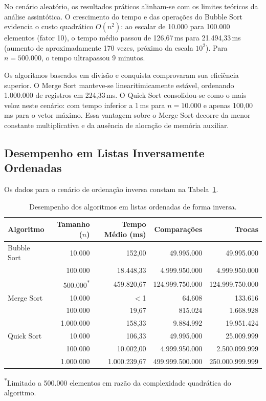 \documentclass[12pt]{article}
\begin{document}
No cenário aleatório, os resultados práticos alinham-se com os limites
teóricos da análise assintótica. O crescimento do tempo e das operações do
Bubble Sort evidencia o custo quadrático $O(n^2)$: ao escalar de 10.000 para
100.000 elementos (fator 10), o tempo médio passou de 126,67\,ms para
21.494,33\,ms (aumento de aproximadamente 170 vezes, próximo da escala
$10^2$). Para $n = 500.000$, o tempo ultrapassou 9 minutos.

Os algoritmos baseados em divisão e conquista comprovaram sua eficiência
superior. O Merge Sort manteve-se linearitimicamente estável, ordenando
1.000.000 de registros em 224,33\,ms. O Quick Sort consolidou-se como o mais
veloz neste cenário: com tempo inferior a 1\,ms para $n = 10.000$ e apenas
100,00\,ms para o vetor máximo. Essa vantagem sobre o Merge Sort decorre da
menor constante multiplicativa e da ausência de alocação de memória auxiliar.

\subsection{Desempenho em Listas Inversamente Ordenadas}

Os dados para o cenário de ordenação inversa constam na
Tabela~\ref{tab:inversas}.

\begin{table}[ht]
\centering
\caption{Desempenho dos algoritmos em listas ordenadas de forma inversa.}
\label{tab:inversas}
\begin{tabular}{l r r r r}
\toprule
\textbf{Algoritmo} & \textbf{Tamanho ($n$)} &
  \textbf{Tempo Médio (ms)} & \textbf{Comparações} & \textbf{Trocas} \\
\midrule
Bubble Sort & 10.000    & 152,00      & 49.995.000        & 49.995.000        \\
            & 100.000   & 18.448,33   & 4.999.950.000     & 4.999.950.000     \\
            & 500.000\textsuperscript{*}
                        & 459.820,67  & 124.999.750.000   & 124.999.750.000   \\
\midrule
Merge Sort  & 10.000    & $<$1        & 64.608            & 133.616           \\
            & 100.000   & 19,67       & 815.024           & 1.668.928         \\
            & 1.000.000 & 158,33      & 9.884.992         & 19.951.424        \\
\midrule
Quick Sort  & 10.000    & 106,33      & 49.995.000        & 25.009.999        \\
            & 100.000   & 10.002,00   & 4.999.950.000     & 2.500.099.999     \\
            & 1.000.000 & 1.000.239,67& 499.999.500.000   & 250.000.999.999   \\
\bottomrule
\end{tabular}
\begin{flushleft}
\footnotesize \textsuperscript{*}Limitado a 500.000 elementos em razão da
complexidade quadrática do algoritmo.
\end{flushleft}
\end{table}
\end{document}
